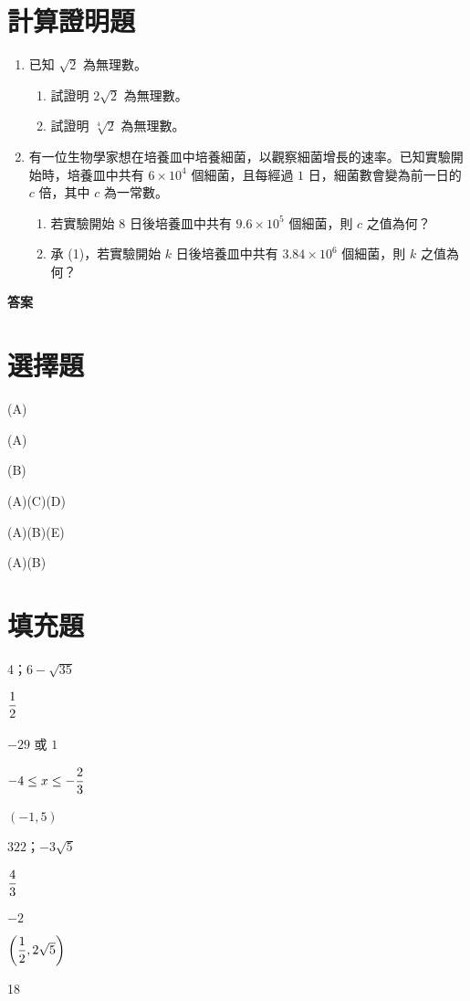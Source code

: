 \documentclass[12pt]{article}
\newcommand*{\fraction}[2]{\rule[-.8\baselineskip]{0pt}{2\baselineskip}\dfrac{#1}{#2}}
\begin{document}
\section{計算證明題}
\begin{enumerate}[align=left,leftmargin=*,labelsep=.6em,parsep=0ex]
  \item 已知 $\sqrt{2}$ 為無理數。
  \begin{enumerate}[label=(\arabic*),align=left,leftmargin=*,labelsep=.4em]
    \item 試證明 $2\sqrt{2}$ 為無理數。
    \item 試證明 $\sqrt[4]{2}$ 為無理數。
  \end{enumerate}
  \newpage
  \item 有一位生物學家想在培養皿中培養細菌，以觀察細菌增長的速率。已知實驗開始時，培養皿中共有 $6 \times 10^4$ 個細菌，且每經過 $1$ 日，細菌數會變為前一日的 $c$ 倍，其中 $c$ 為一常數。
  \begin{enumerate}[label=(\arabic*),align=left,leftmargin=*,labelsep=.4em]
    \item 若實驗開始 8 日後培養皿中共有 $9.6 \times 10^5$ 個細菌，則 $c$ 之值為何？
    \item 承 (1)，若實驗開始 $k$ 日後培養皿中共有 $3.84 \times 10^6$ 個細菌，則 $k$ 之值為何？
  \end{enumerate}
\end{enumerate}

\newpage
{\bfseries\large 答案 \par}
\section*{選擇題}
\begin{enumerate*}[label=\arabic*.,itemjoin=\tab]
  \item (A)
  \item (A)
  \item (B)
  \item (A)(C)(D)
  \item (A)(B)(E)
  \item (A)(B)
\end{enumerate*}
\section*{填充題}
\begin{enumerate*}[label=\Alph*.,itemjoin=\tab]
  \item 4；$6-\sqrt{35}$
  \item $\fraction{1}{2}$
  \item $-29$ 或 $1$
  \item $-4 \leq x \leq -\fraction{2}{3}$
  \item $(-1,5)$
  \item $322$；$-3\sqrt{5}$
  \item $\fraction{4}{3}$
  \item $-2$
  \item $\biggl(\fraction{1}{2}, 2\sqrt{5}\biggr)$
  \item 18
\end{enumerate*}
\end{document}
